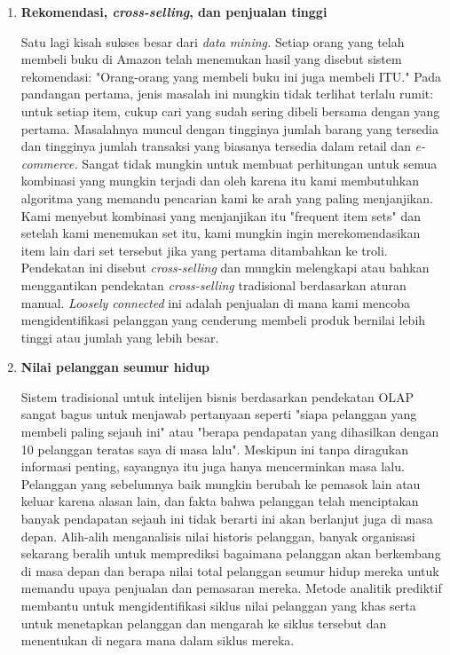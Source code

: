 \begin{enumerate}
  \item \textbf{Rekomendasi, \textit{cross-selling}, dan penjualan tinggi}
    \par Satu lagi kisah sukses besar dari \textit{data mining.} Setiap orang yang telah membeli buku di Amazon telah menemukan hasil yang disebut sistem rekomendasi: "Orang-orang yang membeli buku ini juga membeli ITU." Pada pandangan pertama, jenis masalah ini mungkin tidak terlihat terlalu rumit: untuk setiap item, cukup cari yang sudah sering dibeli bersama dengan yang pertama. Masalahnya muncul dengan tingginya jumlah barang yang tersedia dan tingginya jumlah transaksi yang biasanya tersedia dalam retail dan \textit{e-commerce. }Sangat tidak mungkin untuk membuat perhitungan untuk semua kombinasi yang mungkin terjadi dan oleh karena itu kami membutuhkan algoritma yang memandu pencarian kami ke arah yang paling menjanjikan. Kami menyebut kombinasi yang menjanjikan itu "frequent item sets" dan setelah kami menemukan set itu, kami mungkin ingin merekomendasikan item lain dari set tersebut jika yang pertama ditambahkan ke troli. Pendekatan ini disebut\textit{ cross-selling} dan mungkin melengkapi atau bahkan menggantikan pendekatan\textit{ cross-selling} tradisional berdasarkan aturan manual. \textit{Loosely connected }ini adalah penjualan di mana kami mencoba mengidentifikasi pelanggan yang cenderung membeli produk bernilai lebih tinggi atau jumlah yang lebih besar.
    
    \item	\textbf{Nilai pelanggan seumur hidup }
    \par Sistem tradisional untuk intelijen bisnis berdasarkan pendekatan OLAP sangat bagus untuk menjawab pertanyaan seperti "siapa pelanggan yang membeli paling sejauh ini" atau "berapa pendapatan yang dihasilkan dengan 10 pelanggan teratas saya di masa lalu". Meskipun ini tanpa diragukan informasi penting, sayangnya itu juga hanya mencerminkan masa lalu. Pelanggan yang sebelumnya baik mungkin berubah ke pemasok lain atau keluar karena alasan lain, dan fakta bahwa pelanggan telah menciptakan banyak pendapatan sejauh ini tidak berarti ini akan berlanjut juga di masa depan. Alih-alih menganalisis nilai historis pelanggan, banyak organisasi sekarang beralih untuk memprediksi bagaimana pelanggan akan berkembang di masa depan dan berapa nilai total pelanggan seumur hidup mereka untuk memandu upaya penjualan dan pemasaran mereka. Metode analitik prediktif membantu untuk mengidentifikasi siklus nilai pelanggan yang khas serta untuk menetapkan pelanggan dan mengarah ke siklus tersebut dan menentukan di negara mana dalam siklus mereka.
\end{enumerate}

